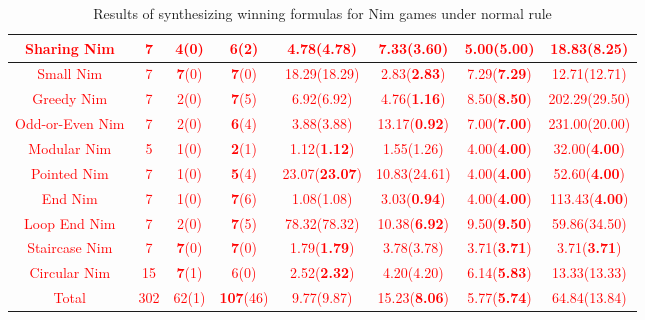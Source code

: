 \documentclass[review]{elsarticle}
\newcommand{\red}[1]{\textcolor{red}{#1}}
\begin{document}
\begin{table}[h!]
{\begin{tabular}{|c|c|c|c|c|c|c|c|}
		\red{Sharing Nim} & \red{7} & \red{4(0)} & \red{\textbf{6}(2)} & \red{4.78(4.78)} & \red{7.33(\textbf{3.60})} & \red{5.00(\textbf{5.00})} & \red{18.83(8.25)} \\ \hline
		\red{Small Nim} & \red{7} & \red{\textbf{7}(0)} & \red{\textbf{7}(0)} & \red{18.29(18.29)} & \red{2.83(\textbf{2.83})} & \red{7.29(\textbf{7.29})} & \red{12.71(12.71)} \\ \hline
		\red{Greedy Nim} & \red{7} & \red{2(0)} & \red{\textbf{7}(5)} & \red{6.92(6.92)} & \red{4.76(\textbf{1.16})} & \red{8.50(\textbf{8.50})} & \red{202.29(29.50)} \\ \hline
		\red{Odd-or-Even Nim} & \red{7} & \red{2(0)} & \red{\textbf{6}(4)} & \red{3.88(3.88)} & \red{13.17(\textbf{0.92})} & \red{7.00(\textbf{7.00})} & \red{231.00(20.00)} \\ \hline
		\red{Modular Nim} & \red{5} & \red{1(0)} & \red{\textbf{2}(1)} & \red{1.12(\textbf{1.12})} & \red{1.55(1.26)} & \red{4.00(\textbf{4.00})} & \red{32.00(\textbf{4.00})} \\ \hline
		\red{Pointed Nim} & \red{7} & \red{1(0)} & \red{\textbf{5}(4)} & \red{23.07(\textbf{23.07})} & \red{10.83(24.61)} & \red{4.00(\textbf{4.00})} & \red{52.60(\textbf{4.00})} \\ \hline
		\red{End Nim} & \red{7} & \red{1(0)} & \red{\textbf{7}(6)} & \red{1.08(1.08)} & \red{3.03(\textbf{0.94})} & \red{4.00(\textbf{4.00})} & \red{113.43(\textbf{4.00})} \\ \hline
		\red{Loop End Nim} & \red{7} & \red{2(0)} & \red{\textbf{7}(5)} & \red{78.32(78.32)} & \red{10.38(\textbf{6.92})} & \red{9.50(\textbf{9.50})} & \red{59.86(34.50)} \\ \hline
		\red{Staircase Nim} & \red{7} & \red{\textbf{7}(0)} & \red{\textbf{7}(0)} & \red{1.79(\textbf{1.79})} & \red{3.78(3.78)} & \red{3.71(\textbf{3.71})} & \red{3.71(\textbf{3.71})} \\ \hline
		\red{Circular Nim} & \red{15} & \red{\textbf{7}(1)} & \red{6(0)} & \red{2.52(\textbf{2.32})} & \red{4.20(4.20)} & \red{6.14(\textbf{5.83})} & \red{13.33(13.33)} \\ \hline
		\red{Total} & \red{302} & \red{62(1)} & \red{\textbf{107}(46)} & \red{9.77(9.87)} & \red{15.23(\textbf{8.06})} & \red{5.77(\textbf{5.74})} & \red{64.84(13.84)} \\ \hline
	\end{tabular}%
	}
	\caption{Results of synthesizing winning formulas for Nim games under normal rule}
	\label{tab:normal-nim-winFormulas}
\end{table}
\end{document}
